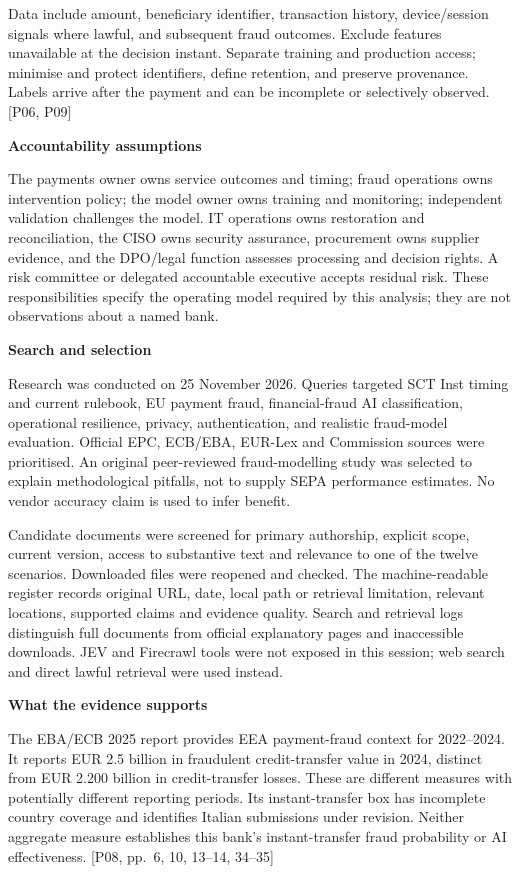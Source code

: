 \documentclass[11pt,a4paper]{article}
\newcommand{\heading}[2]{\vspace*{1mm}{\small\color{ink}\textbf{#1}}\par\vspace{2mm}{\LARGE\color{ink}\textbf{#2}}\par\vspace{3mm}}
\newcommand{\sub}[1]{\par\vspace{2mm}\textbf{\color{ink}#1}\par}
\newcommand{\src}[1]{{\small[#1]}}
\newcommand{\newpageof}[2]{\clearpage\normalsize\fontsize{10.5}{12.5}\selectfont\heading{#1}{#2}}
\begin{document}
Data include amount, beneficiary identifier, transaction history, device/session signals where lawful, and subsequent fraud outcomes. Exclude features unavailable at the decision instant. Separate training and production access; minimise and protect identifiers, define retention, and preserve provenance. Labels arrive after the payment and can be incomplete or selectively observed. \src{P06, P09}
\sub{Accountability assumptions}
The payments owner owns service outcomes and timing; fraud operations owns intervention policy; the model owner owns training and monitoring; independent validation challenges the model. IT operations owns restoration and reconciliation, the CISO owns security assurance, procurement owns supplier evidence, and the DPO/legal function assesses processing and decision rights. A risk committee or delegated accountable executive accepts residual risk. These responsibilities specify the operating model required by this analysis; they are not observations about a named bank.

\newpageof{3 | Reference documentation}{Evidence base and course alignment}
\sub{Search and selection}
Research was conducted on 25 November 2026. Queries targeted SCT Inst timing and current rulebook, EU payment fraud, financial-fraud AI classification, operational resilience, privacy, authentication, and realistic fraud-model evaluation. Official EPC, ECB/EBA, EUR-Lex and Commission sources were prioritised. An original peer-reviewed fraud-modelling study was selected to explain methodological pitfalls, not to supply SEPA performance estimates. No vendor accuracy claim is used to infer benefit.

Candidate documents were screened for primary authorship, explicit scope, current version, access to substantive text and relevance to one of the twelve scenarios. Downloaded files were reopened and checked. The machine-readable register records original URL, date, local path or retrieval limitation, relevant locations, supported claims and evidence quality. Search and retrieval logs distinguish full documents from official explanatory pages and inaccessible downloads. JEV and Firecrawl tools were not exposed in this session; web search and direct lawful retrieval were used instead.
\sub{What the evidence supports}
The EBA/ECB 2025 report provides EEA payment-fraud context for 2022--2024. It reports EUR 2.5 billion in fraudulent credit-transfer value in 2024, distinct from EUR 2.200 billion in credit-transfer losses. These are different measures with potentially different reporting periods. Its instant-transfer box has incomplete country coverage and identifies Italian submissions under revision. Neither aggregate measure establishes this bank's instant-transfer fraud probability or AI effectiveness. \src{P08, pp.~6, 10, 13--14, 34--35}
\end{document}
